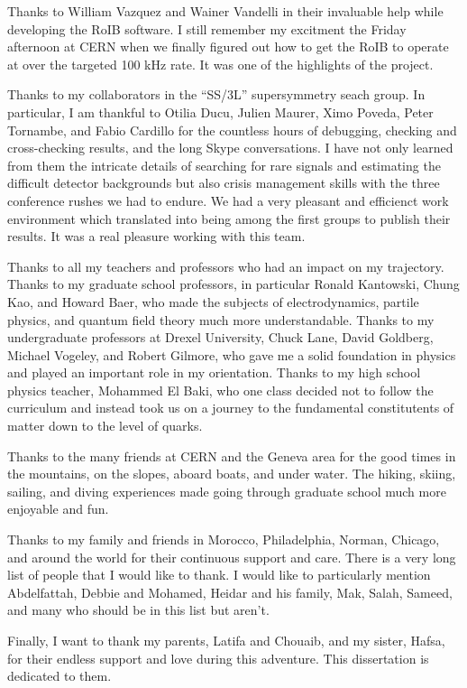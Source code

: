 Thanks to William Vazquez and Wainer Vandelli in their invaluable help while developing the RoIB software.
I still remember my excitment the Friday afternoon at CERN when we finally figured out how to get the RoIB to operate at 
over the targeted 100 kHz rate. It was one of the highlights of the project.

Thanks to my collaborators in the ``SS/3L'' supersymmetry seach group. In particular, I am thankful to 
Otilia Ducu, Julien Maurer, Ximo Poveda, Peter Tornambe, and Fabio Cardillo for the countless hours of debugging, 
checking and cross-checking results, and the long Skype conversations. 
I have not only learned from them the intricate details of searching for rare signals and estimating 
the difficult detector backgrounds but also crisis management skills with the three conference rushes we had to endure. 
We had a very pleasant and efficienct work environment which translated into being among the first groups to 
publish their results.
It was a real pleasure working with this team.

Thanks to all my teachers and professors who had an impact on my trajectory.
Thanks to my graduate school professors, 
in particular Ronald Kantowski, Chung Kao, and Howard Baer, who made the subjects of 
electrodynamics, partile physics, and quantum field theory much more understandable.
Thanks to my undergraduate professors at Drexel University,
Chuck Lane, David Goldberg, Michael Vogeley, and Robert Gilmore, who gave me a solid foundation
in physics and played an important role in my orientation.
Thanks to my high school physics teacher, Mohammed El Baki, who one class decided not to follow
the curriculum and instead took us on a journey to the fundamental constitutents of matter 
down to the level of quarks. 

Thanks to the many friends at CERN and the Geneva area for the good times in the mountains, on the slopes, aboard boats, 
and under water. The hiking, skiing, sailing, and diving experiences made going through graduate school much more enjoyable and fun.

Thanks to my family and friends in Morocco, Philadelphia, Norman, Chicago, and around the world for their continuous support and care. 
There is a very long list of people that I would like to thank. 
I would like to particularly mention Abdelfattah, Debbie and Mohamed, 
Heidar and his family, Mak, Salah, Sameed, and many who should be in this list but aren't. 

Finally, I want to thank my parents, Latifa and Chouaib, and my sister, Hafsa, for their  
endless support and love during this adventure. This dissertation is dedicated to them.






